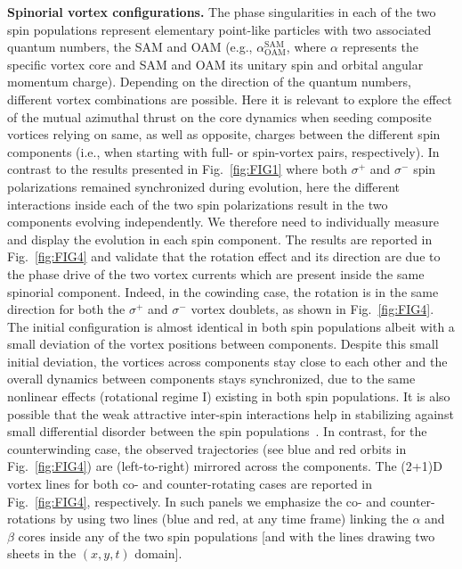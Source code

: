 \documentclass[aps,prb,twocolumn,superscriptaddress,nofootinbib]{revtex4}
\def\editr#1{#1}
\def\refer#1{#1}
\def\edstrike#1{}
\begin{document}
\noindent \editr{\textbf{Spinorial vortex configurations.}}
\editr{The phase singularities in each of the two spin populations
represent elementary point-like particles with two associated quantum numbers,
the SAM and OAM (e.g., ${\alpha}^{\text{SAM}}_{\text{OAM}}$,
where $\alpha$ represents the specific vortex core and SAM and OAM 
its unitary spin and orbital angular momentum charge).
Depending on the direction of the quantum numbers,
different vortex combinations are possible.}
Here \edstrike{we} \editr{it is relevant to} explore
the effect of the mutual azimuthal thrust on the core dynamics
when seeding composite vortices
relying on same, as well as opposite,
charges between the different spin components
\editr{(i.e., when starting with full- or spin-vortex pairs, respectively)}.
%
In contrast to the results presented in Fig.~\ref{fig:FIG1}
where both $\sigma^+$ and $\sigma^-$ spin polarizations
remained synchronized during evolution, here the different interactions
inside each of the two spin polarizations result in the two components
evolving independently. We therefore need to individually measure
and display the evolution in each spin component.
%
The results are reported in Fig.~\ref{fig:FIG4} and validate that the
rotation effect and its direction are due to the phase drive of the
two vortex currents \edstrike{on each other} \refer{which are present} inside the \editr{same} spinorial
component. 
%
Indeed, in the cowinding case, the rotation is in the same
direction for both the $\sigma^+$ and $\sigma^-$ vortex doublets,
as shown in Fig.~\ref{fig:FIG4}.
The initial configuration
is almost identical in both spin populations
albeit with a small deviation of the vortex positions
between components.
%
Despite this small initial deviation, the vortices across components stay close
to each other and the overall dynamics between components stays
synchronized, due to the same
\edstrike{rotational interactions} \refer{nonlinear effects} (\editr{rotational regime I})
existing in both spin populations.
It is also possible that the weak attractive inter-spin interactions
help in stabilizing against small differential disorder between the spin
populations~\cite{dominici_vortex_2015}.
%
In contrast, for the counterwinding case, the observed trajectories
(see blue and red orbits in Fig.~\ref{fig:FIG4})
are (left-to-right) mirrored across the components.
%
The (2+1)D vortex lines for both co- and counter-rotating cases
are reported in Fig.~\ref{fig:FIG4}, respectively.
\editr{In such panels we emphasize the co- and counter-rotations}
by using two lines (blue and red, at any time frame) linking the $\alpha$ and $\beta$ cores
inside any of the two spin populations [and with the lines drawing two sheets in the $(x,y,t)$ domain].\\
\end{document}
